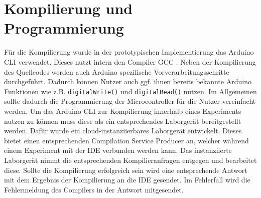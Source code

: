 \section{Kompilierung und Programmierung}\label{section:prototypische-implementierung:kompilierung-und-programmierung}


Für die Kompilierung wurde in der prototypischen Implementierung das \ac{Arduino CLI} \cite{noauthor_arduino-cli_nodate} verwendet. Dieses nutzt intern den Compiler \ac{GCC} \cite{noauthor_gcc_nodate}. Neben der Kompilierung des Quellcodes werden auch Arduino spezifische Vorverarbeitungsschritte durchgeführt. Dadurch können Nutzer auch ggf. ihnen bereits bekannte Arduino Funktionen wie z.B. \texttt{digitalWrite()} und \texttt{digitalRead()} nutzen. Im Allgemeinen sollte dadurch die Programmierung der Microcontroller für die Nutzer vereinfacht werden. Um das \ac{Arduino CLI} zur Kompilierung innerhalb eines Experiments nutzen zu können muss diese als ein entsprechendes Laborgerät bereitgestellt werden. Dafür wurde ein cloud-instanziierbares Laborgerät entwickelt. Dieses bietet einen entsprechenden Compilation Service Producer an, welcher während einem Experiment mit der IDE verbunden werden kann. Das instanziierte Laborgerät nimmt die entsprechenden Kompilieranfragen entgegen und bearbeitet diese. Sollte die Kompilierung erfolgreich sein wird eine entsprechende Antwort mit dem Ergebnis der Kompilierung an die IDE gesendet. Im Fehlerfall wird die Fehlermeldung des Compilers in der Antwort mitgesendet.

